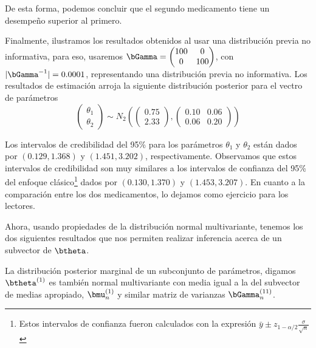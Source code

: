 \begin{Eje}
\begin{knitrout}
\end{knitrout}

De esta forma, podemos concluir que el segundo medicamento tiene un desempeño superior al primero.

Finalmente, ilustramos los resultados obtenidos al usar una distribución previa no informativa, para eso, usaremos $\bGamma=\begin{pmatrix}100&0\\ 0&100\end{pmatrix}$, con $|\bGamma^{-1}|=0.0001$, representando una distribución previa no informativa. Los resultados de estimación arroja la siguiente distribución posterior para el vectro de parámetros 
\begin{equation*}
\begin{pmatrix}
\theta_1\\
\theta_2
\end{pmatrix}
\sim N_2\left(\begin{pmatrix}
0.75\\
2.33
\end{pmatrix},\begin{pmatrix}
0.10&0.06\\
0.06&0.20
\end{pmatrix}\right)
\end{equation*}

Los intervalos de credibilidad del 95\% para los parámetros $\theta_1$ y $\theta_2$ están dados por $(0.129, 1.368)$ y $(1.451, 3.202)$, respectivamente. Observamos que estos intervalos de credibilidad son muy similares a los intervalos de confianza del 95\% del enfoque clásico\footnote{Estos intervalos de confianza fueron calculados con la expresión $\bar{y}\pm z_{1-\alpha/2}\frac{\sigma}{\sqrt{n}}$} dados por $(0.130, 1.370)$ y $(1.453, 3.207)$. En cuanto a la comparación entre los dos medicamentos, lo dejamos como ejercicio para los lectores.
\end{Eje}

Ahora, usando propiedades de la distribución normal multivariante, tenemos los dos siguientes resultados que nos permiten realizar inferencia acerca de un subvector de $\btheta$.
\begin{Res}
La distribución posterior marginal de un subconjunto de parámetros, digamos $\btheta^{(1)}$ es también normal multivariante con media igual a la del subvector de medias apropiado, $\bmu_n^{(1)}$ y similar matriz de varianzas $\bGamma_n^{(11)}$.
\end{Res}
  
